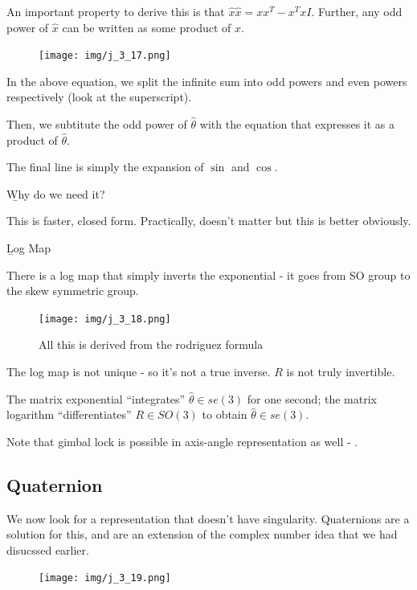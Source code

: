 An important property to derive this is that $\hat{x}\hat{x} = xx^T - x^TxI$. Further, any odd power of $\hat{x}$ can be written as some product of $x$. 

\clearpage

\begin{figure}[h]\centering\texttt{[image: img/j\_3\_17.png]}\end{figure}

In the above equation, we split the infinite sum into odd powers and even powers respectively (look at the superscript). 

Then, we subtitute the odd power of $\hat{\theta}$ with the equation that expresses it as a product of $\hat{\theta}$. 

The final line is simply the expansion of $\sin$ and $\cos$. 

\b{Why do we need it?}

This is faster, closed form. Practically, doesn't matter but this is better obviously.

\b{Log Map}

There is a log map that simply inverts the exponential - it goes from SO group to the skew symmetric group.

\begin{figure}[h]\centering\texttt{[image: img/j\_3\_18.png]}\caption{All this is derived from the rodriguez formula}\end{figure}

The log map is not unique - so it's not a true inverse. $R$ is not truly invertible.

The matrix exponential ``integrates'' $\hat{\theta} \in se(3)$ for one second; the matrix logarithm ``differentiates'' $R \in SO(3)$ to obtain $\hat{\theta} \in se(3)$.

Note that gimbal lock is possible in axis-angle representation as well - .

\subsection{Quaternion}

We now look for a representation that doesn't have singularity. Quaternions are a solution for this, and are an extension of the complex number idea that we had disucssed earlier. 

\begin{figure}[h]\centering\texttt{[image: img/j\_3\_19.png]}\end{figure}

